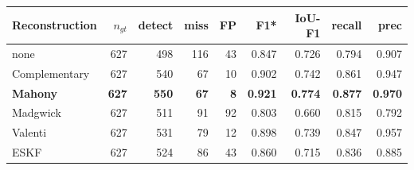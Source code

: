 \begin{tabular}{lrrrrrrrr}
\toprule
Reconstruction & $n_{gt}$ & detect & miss & FP & F1* & IoU-F1 & recall & prec \\
\midrule
none & 627 & 498 & 116 & 43 & 0.847 & 0.726 & 0.794 & 0.907 \\
Complementary & 627 & 540 & 67 & 10 & 0.902 & 0.742 & 0.861 & 0.947 \\
\textbf{Mahony} & \textbf{627} & \textbf{550} & \textbf{67} & \textbf{8} & \textbf{0.921} & \textbf{0.774} & \textbf{0.877} & \textbf{0.970} \\
Madgwick & 627 & 511 & 91 & 92 & 0.803 & 0.660 & 0.815 & 0.792 \\
Valenti & 627 & 531 & 79 & 12 & 0.898 & 0.739 & 0.847 & 0.957 \\
ESKF & 627 & 524 & 86 & 43 & 0.860 & 0.715 & 0.836 & 0.885 \\
\bottomrule
\end{tabular}
